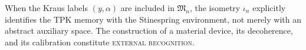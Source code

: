 When the Kraus labels \((y,\alpha)\) are included in
\(\mathfrak M_n\), the isometry \(\iota_n\) explicitly identifies the
TPK memory with the Stinespring environment, not merely with an abstract auxiliary
space. The construction of a material device, its decoherence, and
its calibration constitute \textsc{external recognition}.


